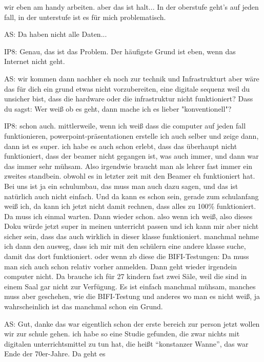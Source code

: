 \documentclass[fontsize=11pt,paper=a4]{scrbook}
\begin{document}
{\begin{itemize*}
		wir eben am handy arbeiten.
		aber das ist halt... In der oberstufe
		geht's auf jeden fall, in der unterstufe
		ist es für mich problematisch.
		\item[AS:] Da haben nicht alle Daten...
	\item[IP8:] Genau, das ist das Problem. Der häufigste Grund ist eben, wenn das Internet nicht geht.
	\item[AS:] wir kommen dann
		nachher eh noch zur technik und Infrastrukturt aber wäre das für dich ein grund
		etwas nicht vorzubereiten, eine	digitale sequenz weil du unsicher bist, 
		dass die hardware oder die
		infrastruktur nicht funktioniert? Dass du sagst: Wer weiß ob es geht, dann mache ich es
		lieber "konventionell"?
		\item[IP8:]schon auch. 	mittlerweile, wenn ich weiß dass die
		computer auf jeden fall funktionieren, 
		powerpoint-präsentationen erstelle ich auch selber und zeige dann, dann ist es super.
		 ich habe es auch
		schon erlebt, dass das überhaupt nicht
		funktioniert, dass der beamer nicht
		gegangen ist, was auch immer, und dann war
		das immer sehr mühsam. Also irgendwie braucht man als lehrer fast immer ein
		zweites standbein. obwohl es in letzter zeit
		mit den Beamer eh funktioniert hat. Bei uns ist ja ein schulumbau, das muss man auch dazu
		sagen, und das ist natürlich auch nicht einfach. Und da kann es schon sein, gerade zum
		schulanfang weiß ich, da kann ich jetzt nicht
		damit rechnen, dass alles zu 100\% funktioniert. Da muss ich einmal warten. Dann wieder schon.
		also wenn ich weiß, also
		dieses Doku würde jetzt super in meinen
		unterricht passen und ich kann mir aber
		nicht sicher sein, dass das auch wirklich
		in dieser klasse funktioniert. manchmal
		nehme ich dann den ausweg, dass ich mir
		mit den schülern eine andere klasse suche, damit das dort funktioniert. oder
		wenn zb diese die BIFI-Testungen: Da muss man
		sich auch schon relativ vorher anmelden. Dann geht wieder irgendein computer nicht. Da brauche ich für 27 kindern fast zwei Säle, weil die sind in einem Saal gar nicht zur Verfügung. Es ist einfach manchmal mühsam, manches muss aber geschehen, wie die BIFI-Testung und anderes wo man es nicht weiß, 
		ja wahrscheinlich ist das manchmal schon ein Grund.
		\item[AS:] Gut, danke das war eigentlich schon der
		erste bereich zur person jetzt wollen wir zur
		schule gehen. 
		ich habe so eine Studie gefunden, die zwar
		nichts mit digitalen unterrichtsmittel
		zu tun hat, die heißt
		"`konstanzer Wanne"', das war Ende der 70er-Jahre. Da geht es

\end{itemize*}}
\end{document}
